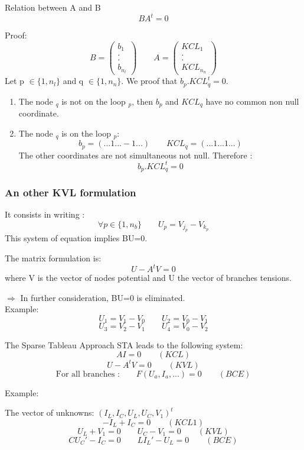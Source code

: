 \frame
{
\begin{block}{Relation between A and B}
\[BA^{t}=0\]
\end{block}
\pause
Proof:
\[B=\left(\begin{array}{c}b_{1}\\.\\.\\b_{n_{l}}\end{array}\right)
\qquad A=\left(\begin{array}{c}KCL_{1}\\.\\.\\KCL_{n_{n}}\end{array}\right)\]
Let p $\in \lbrace 1,n_{l} \rbrace $ and q $\in \lbrace 1,n_{n} \rbrace $. We proof that
$b_{p}.KCL_{q}^{t}=0$.
\begin{figure}[h]
\centerline{
 \scalebox{0.5}{
    
 }
}
\end{figure}

\begin{enumerate}
\item The node $_{q}$ is not on the loop $_{p}$, then $b_{p}$ and $KCL_{q}$ have no common non null coordinate.
\item The node $_{q}$ is on the loop $_{p}$:
\[b_{p}=(...1...-1...)\qquad KCL_{q}=(...1...1...)\]
The other coordinates are not simultaneous not null. Therefore :
\[b_{p}.KCL_{q}^{t}=0\]
\end{enumerate}

}
\frame
{
\frametitle{An other KVL formulation}
\begin{figure}[h]
\centerline{
 \scalebox{0.5}{
    
 }
}
\end{figure}
It consists in writing :
\[\forall p \in \lbrace 1,n_{b} \rbrace \qquad U_{p}=V_{j_{p}}-V_{k_{p}}\]
This system of equation implies BU=0.
\begin{block}{The matrix formulation is:}
\[U-A^{t}V=0\]
where V is the vector of nodes potential and U the vector of branches tensions.\\
\end{block}
$\Rightarrow$ In further consideration, BU=0 is eliminated.\\
Example:
\[U_{1}=V_{1} - V_{0} \qquad U_{2} = V_{0}-V_{1}\]
\[U_{3}=V_{2} - V_{1} \qquad U_{4} = V_{0}-V_{2}\]
}


\frame
{
  \begin{block}{The Sparse Tableau Approach STA leads to the following system:}
  \[AI=0 \qquad (KCL)\]
  \[U-A^{t}V=0 \qquad (KVL)\]
  \[\textrm{For all branches :} \qquad F(U_{a},I_{a},...)=0 \qquad(BCE) \]
  \end{block}  


Example:
  \begin{figure}[h]
   \centerline{
   \scalebox{0.5}{
    
  }
 } 
 \end{figure}
 The vector of unknowns: $(I_{L},I_{C},U_{L},U_{C},V_{1})^{t}$
 \[-I_{L} + I_{C} = 0 \qquad (KCL1)\]
 \[U_{L} + V_{1} = 0 \qquad U_{C} -V_{1}=0\qquad (KVL)\]
 \[CU_{C}'-I_{C}=0 \qquad LI_{L}'-U_{L}=0\qquad (BCE)\]
 
  }

